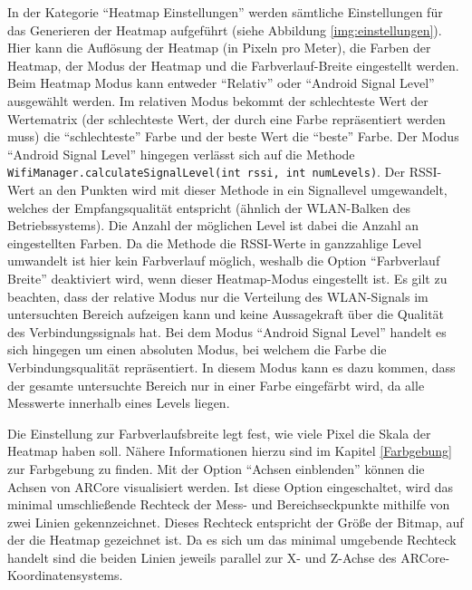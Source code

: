 \documentclass[10pt]{scrartcl}
\newcommand{\inlcode}{\texttt}
\begin{document}
In der Kategorie \enquote{Heatmap Einstellungen} werden sämtliche Einstellungen für das Generieren der Heatmap aufgeführt (siehe Abbildung \ref{img:einstellungen}). Hier kann die Auflösung der Heatmap (in Pixeln pro Meter), die Farben der Heatmap, der Modus der Heatmap und die Farbverlauf-Breite eingestellt werden. Beim Heatmap Modus kann entweder \enquote{Relativ} oder \enquote{Android Signal Level} ausgewählt werden. Im relativen Modus bekommt der schlechteste Wert der Wertematrix (der schlechteste Wert, der durch eine Farbe repräsentiert werden muss) die \enquote{schlechteste} Farbe und der beste Wert die \enquote{beste} Farbe. Der Modus \enquote{Android Signal Level} hingegen verlässt sich auf die Methode \inlcode{WifiManager.calculateSignalLevel(int rssi, int numLevels)}. Der RSSI-Wert an den Punkten wird mit dieser Methode in ein Signallevel umgewandelt, welches der Empfangsqualität entspricht (ähnlich der WLAN-Balken des Betriebssystems). Die Anzahl der möglichen Level ist dabei die Anzahl an eingestellten Farben. Da die Methode die RSSI-Werte in ganzzahlige Level umwandelt ist hier kein Farbverlauf möglich, weshalb die Option \enquote{Farbverlauf Breite} deaktiviert wird, wenn dieser Heatmap-Modus eingestellt ist. Es gilt zu beachten, dass der relative Modus nur die Verteilung des WLAN-Signals im untersuchten Bereich aufzeigen kann und keine Aussagekraft über die Qualität des Verbindungssignals hat. Bei dem Modus \enquote{Android Signal Level} handelt es sich hingegen um einen absoluten Modus, bei welchem die Farbe die Verbindungsqualität repräsentiert. In diesem Modus kann es dazu kommen, dass der gesamte untersuchte Bereich nur in einer Farbe eingefärbt wird, da alle Messwerte innerhalb eines Levels liegen.

Die Einstellung zur Farbverlaufsbreite legt fest, wie viele Pixel die Skala der Heatmap haben soll. Nähere Informationen hierzu sind im Kapitel \ref{Farbgebung} zur Farbgebung zu finden. Mit der Option \enquote{Achsen einblenden} können die Achsen von ARCore visualisiert werden. Ist diese Option eingeschaltet, wird das minimal umschließende Rechteck der Mess- und Bereichseckpunkte mithilfe von zwei Linien gekennzeichnet. Dieses Rechteck entspricht der Größe der Bitmap, auf der die Heatmap gezeichnet ist. Da es sich um das minimal umgebende Rechteck handelt sind die beiden Linien jeweils parallel zur X- und Z-Achse des ARCore-Koordinatensystems.
\end{document}
